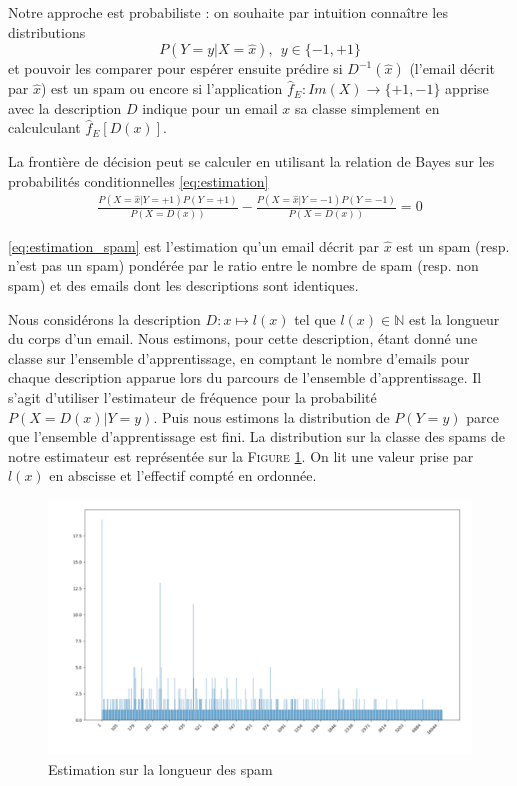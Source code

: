 \documentclass[a4paper, french]{article}
\begin{document}
Notre approche est probabiliste : on souhaite par intuition
conna\^itre les distributions
\label{eq:estimation}
\begin{equation}P(Y=y|X=\hat{x}),\ \ y\in\{-1,+1\}\end{equation}
et pouvoir les comparer pour esp\'erer ensuite pr\'edire si $D^{-1}(\hat{x})$
(l'email d\'ecrit par $\hat{x}$) est un spam ou encore si l'application
$\hat{f}_E\colon Im(X)\rightarrow \{+1,-1\}$ apprise avec la description $D$
indique pour un email $x$ sa classe simplement en calculculant
$\hat{f}_E[ D(x)]$.

La fronti\`ere de d\'ecision peut se calculer en utilisant la relation de Bayes
sur les probabilit\'es conditionnelles \eqref{eq:estimation}
\begin{align}
\label{eq:estimation_spam}
\frac{P(X=\hat{x}|Y=+1)P(Y=+1)}{P(X=D(x))}
- \frac{P(X=\hat{x}|Y=-1)P(Y=-1)}{P(X=D(x))}=0
\end{align}

\eqref{eq:estimation_spam} est l'estimation qu'un email d\'ecrit par $\hat{x}$
est un spam (resp. n'est pas un spam) pond\'er\'ee par le ratio entre le nombre
de spam (resp. non spam) et des emails dont les descriptions sont identiques.

Nous consid\'erons la description $D\colon x\mapsto l(x)$
tel que $l(x)\in \mathbb{N}$ est la longueur du corps d'un email.
Nous estimons, pour cette description, \'etant donn\'e une classe
sur l'ensemble d'apprentissage, en comptant le nombre d'emails
pour chaque description apparue lors du parcours de l'ensemble d'apprentissage.
Il s'agit d'utiliser l'estimateur de fr\'equence pour la probabilit\'e
$P(X=D(x)|Y=y)$. Puis nous estimons la distribution de $P(Y=y)$ parce que
l'ensemble d'apprentissage est fini.
La distribution sur la classe des spams de notre estimateur est
repr\'esent\'ee sur la F\textsc{igure} \ref{fig:histo1spam}.
On lit une valeur prise par $l(x)$ en abscisse et l'effectif compt\'e
en ordonn\'ee.

\begin{figure}[h]
\begin{center}
    \caption{Estimation sur la longueur des spam}
    \label{fig:histo1spam}
    \includegraphics[width=13cm]{histo}
\end{center}
\end{figure}
\end{document}
